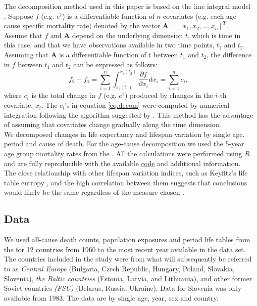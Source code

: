 \documentclass{article}
\newcommand{\vect}[1]{\boldsymbol{#1}}
\begin{document}
\begin{spacing}{1.5}
The decomposition method used in this paper is based on the line integral model \citep{horiuchi2008}. Suppose $f$ (e.g. $e^\dagger$) is a differentiable function of $n$ covariates (e.g. each age-cause specific mortality rate) denoted by the vector $\vect{A} = \left[x_1,x_2,\ldots,x_n \right]^T$. Assume that $f$ and $\vect{A}$ depend on the underlying dimension $t$, which is time in this case, and that we have observations available in two time points, $t_1$ and $t_2$. Assuming that $\vect{A}$ is a differentiable function of $t$ between $t_1$ and $t_2$, the difference in $f$ between $t_1$ and $t_2$ can be expressed as follows:
\begin{equation}
\label{eq.decom}
f_2-f_1 = \sum_{i = 1}^n \int_{x_i(t_1)}^{x_i(t_2)}\frac{\partial f}{\partial x_i}dx_i=\sum_{i = 1}^nc_i ,
\end{equation}
where $c_i$ is the total change in $f$ (e.g. $e^\dagger$) produced by changes in the $i$-th covariate, $x_i$. The $c_i$'s in equation \eqref{eq.decom} were computed by numerical integration following the algorithm suggested by \citet{horiuchi2008}. This method has the advantage of assuming that covariates change gradually along the time dimension.\\

We decomposed changes in life expectancy and lifespan variation by single age, period and cause of death. For the age-cause decomposition we used the 5-year age group mortality rates from the \cite{HcO}. All the calculations were performed using \textit{R} \citep{team2000r} and are fully reproducible with the available \href{https://github.com/jmaburto/Lifespan-variation-in-Eastern-Europe-2017}{code} and additional information.\\

The close relationship with other lifespan variation indices, such as Keyfitz's life table entropy \citep{vaupel&Canudas2003}, and the high correlation between them suggests that conclusions would likely be the same regardless of the measure chosen \citep{vanraalte2013,vaupel2011,wilmoth1999}.\\


\subsection*{Data}
We used all-cause death counts, population exposures and period life tables from the \citet{HMD} for 12 countries from 1960 to the most recent year available in the data set. The countries included in the study were from what will subsequently be referred to as \textit{Central Europe} (Bulgaria, Czech Republic, Hungary, Poland, Slovakia, Slovenia), \textit{the Baltic countries} (Estonia, Latvia, and Lithuania), and other former Soviet countries \textit{(FSU)} (Belarus, Russia, Ukraine). Data for Slovenia was only available from 1983. The data are by single age, year, sex and country.\\


\end{spacing}
\end{document}
